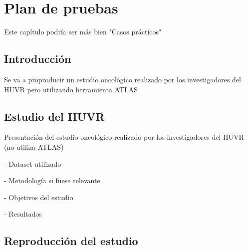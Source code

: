 \chapter{Plan de pruebas}\label{cap:08pruebas}


Este capítulo podría ser más bien "Casos prácticos"

\section{Introducción}

Se va a proproducir un estudio oncológico realizado por los investigadores del HUVR pero utilizando herramienta ATLAS

\section{Estudio del HUVR}

Presentación del estudio oncológico realizado por los investigadores del HUVR  (no utiliza ATLAS)

- Dataset utilizado

- Metodología si fuese relevante

- Objetivos del estudio

- Resultados



\section{Reproducción del estudio}

